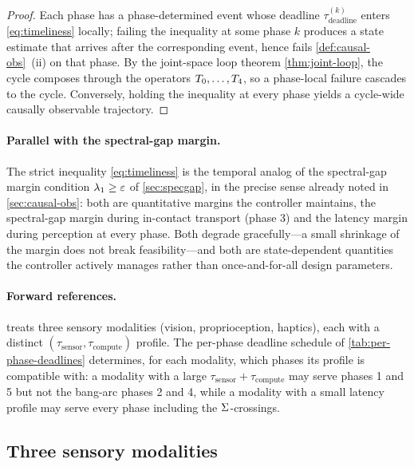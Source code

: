 \begin{proof}
Each phase has a phase-determined event whose deadline
$\tau_{\mathrm{deadline}}^{(k)}$ enters \eqref{eq:timeliness}
locally; failing the inequality at some phase $k$ produces a
state estimate that arrives after the corresponding event, hence
fails \cref{def:causal-obs}~(ii) on that phase. By the joint-space
loop theorem \cref{thm:joint-loop}, the cycle composes through
the operators $T_{0}, \ldots, T_{4}$, so a phase-local
failure cascades to the cycle. Conversely, holding the inequality
at every phase yields a cycle-wide causally observable trajectory.
\end{proof}

\paragraph{Parallel with the spectral-gap margin.}
The strict inequality \eqref{eq:timeliness} is the temporal
analog of the spectral-gap margin condition $\lambda_{1} \ge
\varepsilon$ of \cref{sec:specgap}, in the precise sense already
noted in \cref{sec:causal-obs}: both are quantitative margins the
controller maintains, the spectral-gap margin during in-contact
transport (phase 3) and the latency margin during perception at
every phase. Both degrade gracefully---a small shrinkage of the
margin does not break feasibility---and both are state-dependent
quantities the controller actively manages rather than
once-and-for-all design parameters.

\paragraph{Forward references.}
 treats three sensory modalities (vision,
proprioception, haptics), each with a distinct
$(\tau_{\mathrm{sensor}}, \tau_{\mathrm{compute}})$ profile.
The per-phase deadline schedule of
\cref{tab:per-phase-deadlines} determines, for each modality,
which phases its profile is compatible with: a modality with a
large $\tau_{\mathrm{sensor}} + \tau_{\mathrm{compute}}$ may
serve phases 1 and 5 but not the bang-arc phases 2 and 4, while a
modality with a small latency profile may serve every phase
including the $\Sigma$-crossings.

\subsection{Three sensory modalities}
\label{sec:perception-three-modalities}

